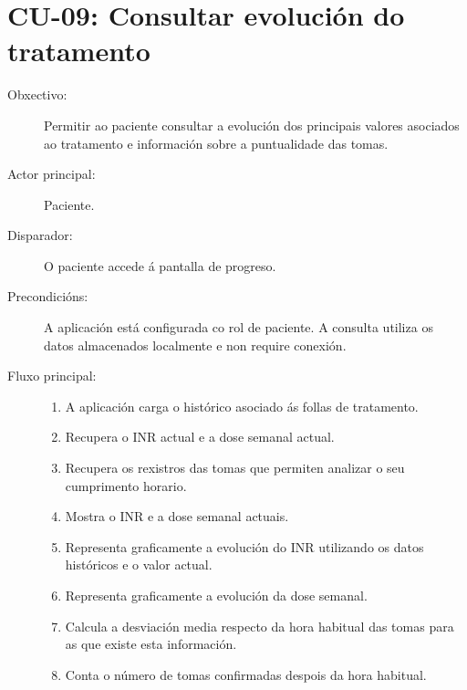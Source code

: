 
\section{CU-09: Consultar evolución do tratamento}
\label{cu:consultar-evolucion}

\begin{description}

\item[Obxectivo:] Permitir ao paciente consultar a evolución dos principais
valores asociados ao tratamento e información sobre a puntualidade das tomas.

\item[Actor principal:] Paciente.

\item[Disparador:] O paciente accede á pantalla de progreso.

\item[Precondicións:] A aplicación está configurada co rol de paciente. A
consulta utiliza os datos almacenados localmente e non require conexión.

\item[Fluxo principal:] \hfill
\begin{enumerate}
    \item A aplicación carga o histórico asociado ás follas de tratamento.

    \item Recupera o INR actual e a dose semanal actual.

    \item Recupera os rexistros das tomas que permiten analizar o seu
    cumprimento horario.

    \item Mostra o INR e a dose semanal actuais.

    \item Representa graficamente a evolución do INR utilizando os datos
    históricos e o valor actual.

    \item Representa graficamente a evolución da dose semanal.

    \item Calcula a desviación media respecto da hora habitual das tomas para as
    que existe esta información.

    \item Conta o número de tomas confirmadas despois da hora habitual.


\end{enumerate}
\end{description}
